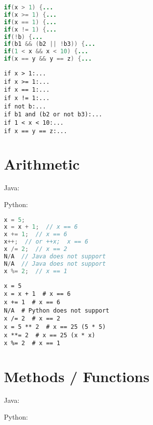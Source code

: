 \documentclass{article}
\begin{document}
\begin{minipage}{0.45\linewidth}
    \begin{lstlisting}[language=Java]
if(x > 1) {...
if(x >= 1) {...
if(x == 1) {...
if(x != 1) {...
if(!b) {...
if(b1 && (b2 || !b3)) {...
if(1 < x && x < 10) {...
if(x == y && y == z) {...
    \end{lstlisting}
\end{minipage}
\hfill
\begin{minipage}{0.45\linewidth}
    \begin{lstlisting}
if x > 1:...
if x >= 1:...
if x == 1:...
if x != 1:...
if not b:...
if b1 and (b2 or not b3):...
if 1 < x < 10:...
if x == y == z:...
    \end{lstlisting}
\end{minipage}

\section{Arithmetic}
\begin{minipage}{0.45\linewidth}
    Java:
\end{minipage}
\hfill
\begin{minipage}{0.45\linewidth}
    Python:
\end{minipage}

\begin{minipage}{0.45\linewidth}
    \begin{lstlisting}[language=Java]
x = 5;
x = x + 1;  // x == 6
x += 1;  // x == 6
x++;  // or ++x;  x == 6
x /= 2;  // x == 2
N/A  // Java does not support
N/A  // Java does not support
x %= 2;  // x == 1
    \end{lstlisting}
\end{minipage}
\hfill
\begin{minipage}{0.45\linewidth}
    \begin{lstlisting}
x = 5
x = x + 1  # x == 6
x += 1  # x == 6
N/A  # Python does not support
x /= 2  # x == 2
x = 5 ** 2  # x == 25 (5 * 5)
x **= 2  # x == 25 (x * x)
x %= 2  # x == 1
    \end{lstlisting}
\end{minipage}

\section{Methods / Functions}
\begin{minipage}{0.45\linewidth}
    Java:
\end{minipage}
\hfill
\begin{minipage}{0.45\linewidth}
    Python:
\end{minipage}
\end{document}
